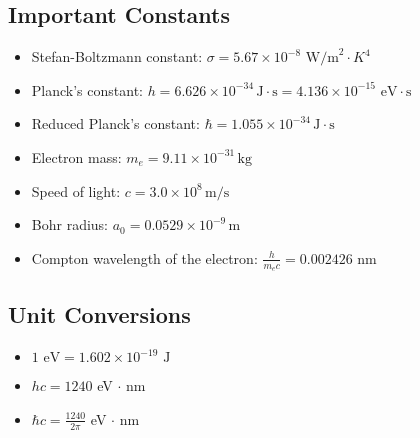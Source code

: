 \documentclass{article}
\newcommand{\tipbox}[1]{\begin{tcolorbox}[colback=green!10] #1 \end{tcolorbox}}
\newcommand{\planckconst}{6.626\times 10^{-34}\,\text{J}\cdot\text{s}}
\newcommand{\redplanck}{1.055\times 10^{-34}\,\text{J}\cdot\text{s}}
\newcommand{\electronmass}{9.11\times 10^{-31}\,\text{kg}}
\newcommand{\lightspeed}{3.0\times 10^{8}\,\text{m}/\text{s}}
\newcommand{\bohrradius}{0.0529\times 10^{-9}\,\text{m}}
\newcommand{\stefan}{5.67\times10^{-8}\text{ W/m}^2\cdot K^4}
\newcommand{\compton}{0.002426\text{ nm}}
\begin{document}
\subsection{Important Constants}
\tipbox{
\begin{itemize}
    \item Stefan-Boltzmann constant: $\sigma = \stefan$
    \item Planck's constant: $h = \planckconst = 4.136\times10^{-15}\text{ eV}\cdot\text{s}$
    \item Reduced Planck's constant: $\hbar = \redplanck$
    \item Electron mass: $m_e = \electronmass$
    \item Speed of light: $c = \lightspeed$
    \item Bohr radius: $a_0 = \bohrradius$
    \item Compton wavelength of the electron: $\displaystyle\frac{h}{m_ec} = \compton$
\end{itemize}
}

\subsection{Unit Conversions}
\tipbox{
\begin{itemize}
    \item $1 \text{ eV} = 1.602 \times 10^{-19} \text{ J}$
    \item $hc = 1240$ eV $\cdot$ nm
    \item $\hbar c = \displaystyle\frac{1240}{2\pi}$ eV $\cdot$ nm
\end{itemize}
}
\end{document}
